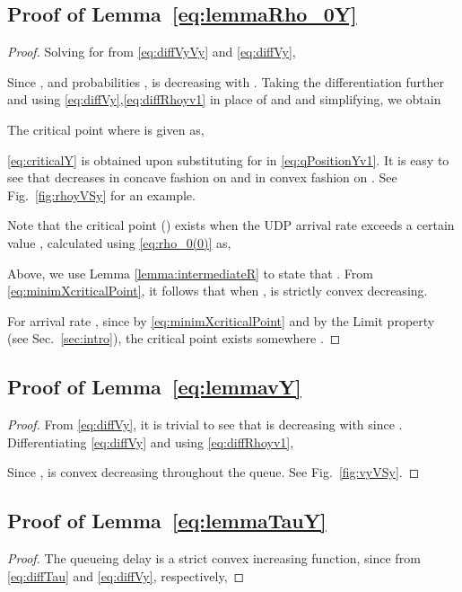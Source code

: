 \documentclass{IEEEtran}
\begin{document}
    \subsection*{Proof of Lemma~\ref{eq:lemmaRho_0Y}}
    \vspace{3mm}
\begin{proof}
     Solving for  from \eqref{eq:diffVyVy}  and \eqref{eq:diffVy},
        
        Since , and probabilities ,  is decreasing with . Taking the differentiation further and using \eqref{eq:diffVy},\eqref{eq:diffRhoyv1} in place of  and  and simplifying, we obtain
        
    The critical point  where  is given as,
    

    \eqref{eq:criticalY} is obtained upon substituting  for  in \eqref{eq:qPositionYv1}.
    It is easy to see that  decreases in concave fashion on  and in convex fashion on . See Fig.~\ref{fig:rhoyVSy} for an example.

    Note that the critical point () exists when the UDP arrival rate  exceeds a certain value , calculated using \eqref{eq:rho_0(0)} as,
    

    Above, we use Lemma \ref{lemma:intermediateR} to state that . From \eqref{eq:minimXcriticalPoint}, it follows that when ,  is strictly convex decreasing.

     For arrival rate , since  by \eqref{eq:minimXcriticalPoint} and  by the Limit property (see Sec.~\ref{sec:intro}), the critical point exists somewhere .

     \end{proof}

    \subsection*{Proof of Lemma~\ref{eq:lemmavY}}
    \vspace{3mm}
\begin{proof}
    From \eqref{eq:diffVy}, it is trivial to see that  is  decreasing with  since  . Differentiating \eqref{eq:diffVy} and using \eqref{eq:diffRhoyv1},
    
    Since ,  is convex decreasing throughout the queue. See Fig.~\ref{fig:vyVSy}.
    \end{proof}

    \subsection*{Proof of Lemma~\ref{eq:lemmaTauY}}
    \vspace{3mm}
\begin{proof}
     The queueing delay is a strict convex increasing function, since from \eqref{eq:diffTau} and \eqref{eq:diffVy}, respectively,
      
      \end{proof}
\end{document}
